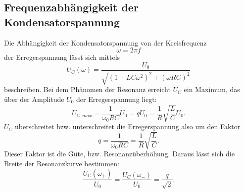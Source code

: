 \subsection{Frequenzabhängigkeit der Kondensatorspannung}
Die Abhängigkeit der Kondensatorspannung von der Kreisfrequenz
\begin{equation*}
    \omega = 2\pi f
\end{equation*}
der Erregerspannung lässt sich mittels 
\begin{equation}
    U_{C}(\omega)= \frac{U_{0}}{\sqrt{(1-LC\omega^{2})^{2} + (\omega R C)^{2}}}
\end{equation}
beschreiben.
Bei dem Phänomen der Resonanz erreicht $U_{C}$ ein Maximum, das über der Amplitude $U_{0}$ der Erregerspannung liegt:
\begin{equation}
    U_{C, max} = \frac{1}{\omega_{0}RC} U_{0} = q U_{0} = \frac{1}{R} \sqrt{\frac{L}{C}} U_{0}.
    \label{eqn:ucmax}
\end{equation}
$U_{C}$ überschreitet bzw. unterschreitet die Erregerspannung also um den Faktor 
\begin{equation}
    q = \frac{1}{\omega_{0}RC} = \frac{1}{R} \sqrt{\frac{L}{C}}.
    \label{eqn:q}
\end{equation}
Dieser Faktor ist die Güte, bzw. Resonanzüberhöhung.
Daraus lässt sich die Breite der Resonanzkurve bestimmen:
\begin{equation}
    \frac{U_{C}(\omega_+)}{U_0} = \frac{U_{C}(\omega_-)}{U_0} = \frac{q}{\sqrt{2}}.
    \label{eqn:breite}
\end{equation}

